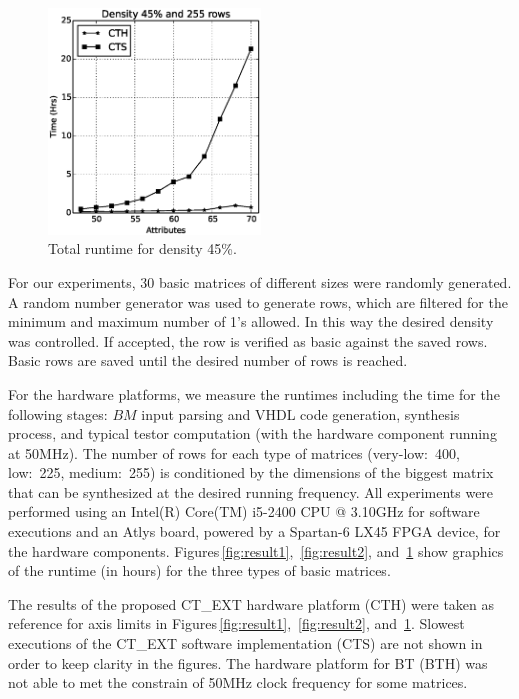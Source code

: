 \documentclass[authoryear,11pt]{elsarticle}
\begin{document}
	\begin{figure}[htb]
	    \begin{center}
	       \includegraphics[height=6cm]{med48_density.eps}
	    \end{center}
	\caption{Total runtime for density 45\%.}
	\label{fig:result3}
	\end{figure}	
	
	For our experiments, 30 basic matrices of different sizes were randomly generated. 
	A random number generator was used to generate rows, which are
	filtered for the minimum and maximum number of 1's allowed. In this way the desired density was
	controlled. If accepted, the row is verified as basic against the saved rows. Basic rows 
	are saved until the desired number of rows is reached. 
	
	For the hardware platforms, we measure the runtimes including the time for the following stages: $BM$ 
	input parsing and VHDL code generation, synthesis process, and typical testor computation (with the
	hardware component running at 50MHz). The number of rows for each type of matrices (very-low:~400, low:~225,
	medium:~255) is conditioned by the dimensions of the biggest matrix that can be synthesized at the desired
	running frequency.
	All experiments were performed using an Intel(R) Core(TM) i5-2400 CPU @ 3.10GHz for software executions and 
	an Atlys board, powered by a Spartan-6 LX45 FPGA device, for the hardware components.
	Figures\,\ref{fig:result1}, \,\ref{fig:result2}, and \,\ref{fig:result3} show graphics of the runtime 
	(in hours) for the three types of basic matrices. 
	
	The results of the proposed CT\_EXT hardware platform (CTH) were taken as reference for axis limits in 
	Figures\,\ref{fig:result1}, \,\ref{fig:result2}, and \,\ref{fig:result3}.
	Slowest executions of the CT\_EXT software implementation (CTS) are not shown in order to keep clarity in 
	the figures. 
	The hardware platform for BT (BTH) was not able to met the constrain of 50MHz clock frequency for some 
	matrices.
	
\end{document}
